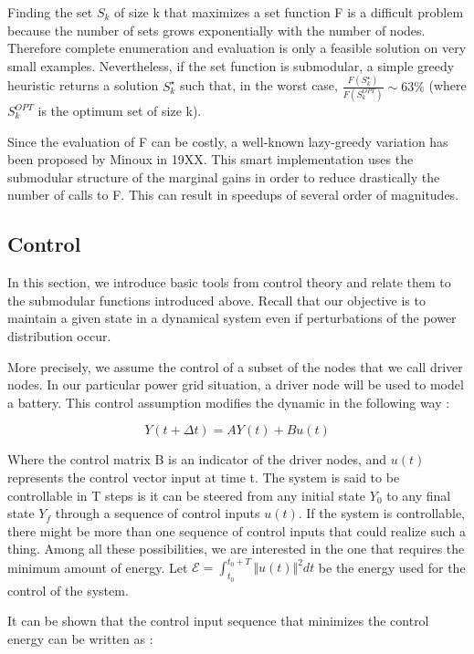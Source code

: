 \documentclass[10pt,twoside%
                ,draft%
        ]{article}
\begin{document}
Finding the set $ S_k $ of size k that maximizes a set function F is a difficult problem because the number of sets grows exponentially with the number of nodes. Therefore complete enumeration and evaluation is only a feasible solution on very small examples. Nevertheless, if the set function is submodular, a simple greedy heuristic returns a solution $ S_k^{\star} $ such that, in the worst case, $ \frac{F(S_k^{\star})}{F(S_k^{OPT})} \sim 63\%$ (where $ S_k^{OPT}$ is the optimum set of size k). 

Since the evaluation of F can be costly, a well-known lazy-greedy variation has been proposed by Minoux in 19XX. This smart implementation uses the submodular structure of the marginal gains in order to reduce drastically the number of calls to F. This can result in speedups of several order of magnitudes.

\subsection{Control}

In this section, we introduce basic tools from control theory and relate them to the submodular functions introduced above. Recall that our objective is to maintain a given state in a dynamical system even if perturbations of the power distribution occur. 

More precisely, we assume the control of a subset of the nodes that we call driver nodes. In our particular power grid situation, a driver node will be used to model a battery. This control assumption modifies the dynamic in the following way :

\begin{equation}
 Y(t+\Delta t) = A Y(t) + B u(t) 
\end{equation}

Where the control matrix B is an indicator of the driver nodes, and $ u(t) $ represents the control vector input at time t. The system is said to be controllable in T steps is it can be steered from any initial state $ Y_0 $ to any final state $ Y_f $ through a sequence of control inputs $ u(t) $. If the system is controllable, there might be more than one sequence of control inputs that could realize such a thing. Among all these possibilities, we are interested in the one that requires the minimum amount of energy. Let $ \mathcal{E} = \int_{t_0}^{t_0+T} \Vert u(t) \Vert^2 dt $ be the energy used for the control of the system.

It can be shown that the control input sequence that minimizes the control energy can be written as :
\end{document}
